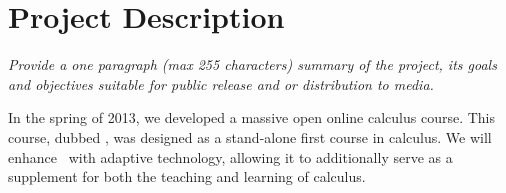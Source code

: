 \section{Project Description}

\textsl{Provide a one paragraph (max 255 characters) summary of the project,
its goals and objectives suitable for public release and or
distribution to media.}

\vspace{\topsep}

In the spring of 2013, we developed a massive open online calculus
course. This course, dubbed \mooculus, was designed as a stand-alone
first course in calculus.  We will enhance \mooculus\ with adaptive
technology, allowing it to additionally serve as a supplement for both
the teaching and learning of calculus.


